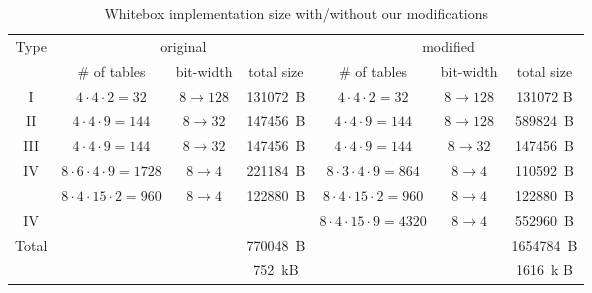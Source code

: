 \documentclass[11pt,oneside,final]{fithesis2}
\newcommand{\clg}{\cellcolor{Gray}}
\begin{document}
    \begin{center}
    \begin{table}[ht]
    \begin{tabular}{ | c | c | c | c | c | c | c | }
	\hline
	\multirow{2}{*}{Type}       & \multicolumn{3}{c|}{original}                                       & \multicolumn{3}{c|}{modified}                                           \\ \cline{2-7}
	                            & \# of tables                  & bit-width         & total size      & \# of tables                    & bit-width             & total size    \\ \hline
	I                           & $4\cdot4\cdot2=32$            & $8\rightarrow128$ & 131072~B        & $4\cdot4\cdot2=32$              & $8\rightarrow128$     & 131072 B      \\
	II                          & $4\cdot4\cdot9=144$           & $8\rightarrow32$  & 147456~B        & $4\cdot4\cdot9=144$             & $8\rightarrow128$\clg & 589824~B\clg  \\
	III                         & $4\cdot4\cdot9=144$           & $8\rightarrow32$  & 147456~B        & $4\cdot4\cdot9=144$             & $8\rightarrow32$      & 147456~B      \\
	\multirow{2}{*}{IV}         & $8\cdot6\cdot4\cdot9=1728$    & $8\rightarrow4$   & 221184~B        & $8\cdot3\cdot4\cdot9=864$  \clg & $8\rightarrow4$       & 110592~B\clg  \\ 
	                            & $8\cdot4\cdot15\cdot2=960$    & $8\rightarrow4$   & 122880~B        & $8\cdot4\cdot15\cdot2=960$      & $8\rightarrow4$       & 122880~B      \\ 
	IV                          &                               &                   &                 & $8\cdot4\cdot15\cdot9=4320$\clg & $8\rightarrow4$ \clg  & 552960~B\clg  \\ \hline\hline
	\multirow{2}{*}{Total}      &                               &                   & 770048~B        &                                 &                       & 1654784~B\clg \\ 
                                    &                               &                   & 752~kB          &                                 &                       & 1616~k  B\clg \\ \hline
    \end{tabular}
    \caption{Whitebox implementation size with/without our modifications}\label{tbl:table_sizes}
    \end{table}
    \end{center}
    
\end{document}
